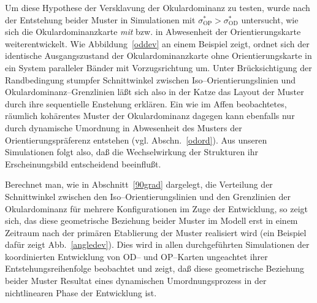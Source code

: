 Um diese Hypothese der Versklavung der Okulardominanz zu testen, wurde nach
der Entstehung beider Muster in Simulationen mit
$\sigma^\ast_{\text{OP}}>\sigma^\ast_{\text{OD}}$ untersucht, wie sich die
Okulardominanzkarte \emph{mit} bzw. in Abwesenheit der Orientierungskarte
weiterentwickelt. Wie Abbildung~\ref{oddev} an einem Beispiel zeigt, ordnet
sich der identische Ausgangszustand der Okulardominanzkarte ohne
Orientierungskarte in ein System paralleler Bänder mit Vorzugsrichtung um.
Unter Brücksichtigung der Randbedingung stumpfer Schnittwinkel zwischen
Iso--Orientierungslinien und Okulardominanz--Grenzlinien läßt sich also
in der Katze das Layout der Muster durch ihre sequentielle Enstehung
erklären. Ein wie im Affen beobachtetes, räumlich kohärentes Muster der
Okulardominanz dagegen kann ebenfalls nur durch dynamische Umordnung in
Abwesenheit des Musters der Orientierungspräferenz entstehen
(vgl. Abschn.~\ref{odord}). Aus unseren Simulationen folgt also, daß die
Wechselwirkung der Strukturen ihr Erscheinungsbild entscheidend
beeinflußt.

Berechnet man, wie in Abschnitt~\ref{90grad} dargelegt, die Verteilung der
Schnittwinkel zwischen den Iso--Orientierungslinien und den Grenzlinien der
Okulardominanz für mehrere Konfigurationen im Zuge der Entwicklung, so
zeigt sich, das diese geometrische Beziehung beider Muster im Modell erst
in einem Zeitraum nach der primären Etablierung der Muster realisiert
wird (ein Beispiel dafür zeigt Abb.~\ref{angledev}). Dies wird in allen
durchgeführten Simulationen der koordinierten Entwicklung von OD-- und
OP--Karten ungeachtet ihrer Entstehungsreihenfolge beobachtet und zeigt,
daß diese geometrische Beziehung beider Muster Resultat eines dynamischen
Umordnungsprozess in der nichtlinearen Phase der Entwicklung ist.
